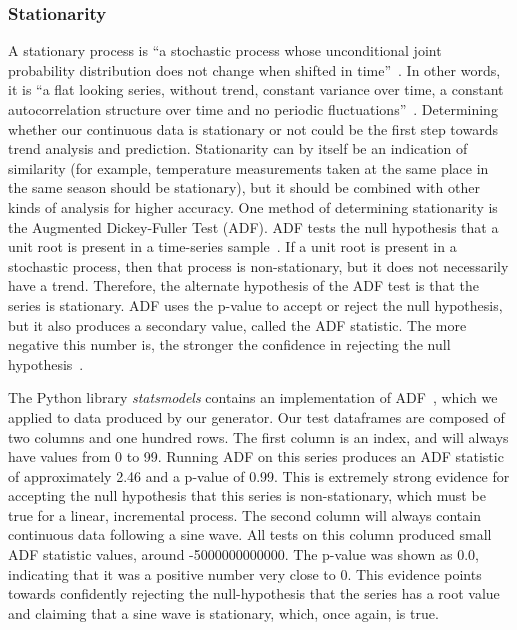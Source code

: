 \subsubsection{Stationarity}
A stationary process is ``a stochastic process whose unconditional joint probability distribution does not change when shifted
in time''~\cite{Gagniuc2017}.
In other words, it is ``a flat looking series, without trend, constant variance over time, a constant autocorrelation structure
over time and no periodic fluctuations''~\cite{EngineeringStatisticsHandbook}.
Determining whether our continuous data is stationary or not could be the first step towards trend analysis and prediction.
Stationarity can by itself be an indication of similarity (for example, temperature measurements taken at the same place
in the same season should be stationary), but it should be combined with other kinds of analysis for higher accuracy.
One method of determining stationarity is the Augmented Dickey-Fuller Test (ADF).
ADF tests the null hypothesis that a unit root is present in a time-series sample~\cite{Greene1997}.
If a unit root is present in a stochastic process, then that process is non-stationary, but it does not necessarily have a trend.
Therefore, the alternate hypothesis of the ADF test is that the series is stationary.
ADF uses the p-value to accept or reject the null hypothesis, but it also produces a secondary value, called the ADF statistic.
The more negative this number is, the stronger the confidence in rejecting the null hypothesis~\cite{Greene1997}.

\bigbreak

The Python library \textit{statsmodels} contains an implementation of ADF~\cite{statsmodels}, which we applied to data produced
by our generator.
Our test dataframes are composed of two columns and one hundred rows.
The first column is an index, and will always have values from 0 to 99.
Running ADF on this series produces an ADF statistic of approximately 2.46 and a p-value of 0.99.
This is extremely strong evidence for accepting the null hypothesis that this series is non-stationary, which must be true
for a linear, incremental process.
The second column will always contain continuous data following a sine wave.
All tests on this column produced small ADF statistic values, around -5000000000000.
The p-value was shown as 0.0, indicating that it was a positive number very close to 0.
This evidence points towards confidently rejecting the null-hypothesis that the series has a root value and claiming that
a sine wave is stationary, which, once again, is true.

